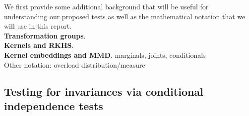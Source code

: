 We first provide some additional background that will be useful for understanding our proposed tests as well as the mathematical notation that we will use in this report.
\\

\textbf{Transformation groups}. \todo
\\

\textbf{Kernels and RKHS}. \todo
\\

\textbf{Kernel embeddings and MMD}. \todo marginals, joints, conditionals
\\

\todo Other notation: overload distribution/measure


\subsection{Testing for invariances via conditional independence tests} \label{sec:condind}


